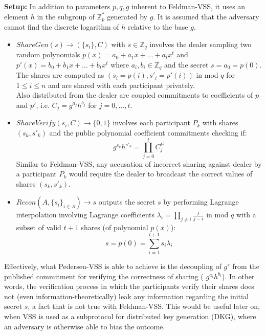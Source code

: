 \documentclass[letterpaper,twocolumn,10pt]{article}
\theoremstyle{definition}
\theoremstyle{remark}
\begin{document}
\textbf{Setup:} In addition to parameters $p,q,g$ inherent to Feldman-VSS, it uses an element $h$ in the subgroup of $\mathbb{Z}^*_p$ generated by $g$. It is assumed that the adversary cannot find the discrete logarithm of $h$ relative to the base $g$.

\begin{itemize}
\item $ShareGen(s) \rightarrow (\{s_i\}, C)$ with $s \in \mathbb{Z}_q$ involves the dealer sampling two random polynomials $p(x) = a_0 + a_1x+ \ldots+a_tx^t$ and $p'(x) = b_0 + b_1x +\ldots+b_tx^t$  where $a_i, b_i \in \mathbb{Z}_q$ and the secret $s = a_0 = p(0)$.\\
The shares are computed as $(s_i = p(i), s'_i = p'(i))$ in mod $q$ for $1 \le i \le n$ and are shared with each participant privately.\\
Also distributed from the dealer are coupled commitments to coefficients of $p$ and $p'$, i.e. $C_j = g^{a_j} h^{b_j}$ for $j = 0, ..., t$.
\item $ShareVerify(s_i, C) \rightarrow \{0, 1\}$ involves each participant $P_k$ with shares $(s_k, s'_k)$ and the public polynomial coefficient commitments checking if:
$$g^{s_k} h^{s'_k} = \prod_{j = 0}^{t} C_j^{k^j}$$
Similar to Feldman-VSS, any accusation of incorrect sharing against dealer by a participant $P_k$ would require the dealer to broadcast the correct values of shares $(s_k, s'_k)$.
\item $Recon(A, \{s_i\}_{i \in A}) \rightarrow s$ outputs the secret $s$ by performing Lagrange interpolation involving Lagrange coefficients $\lambda_i = \prod_{j \neq i} \frac{j}{j - i}$ in mod $q$ with a subset of valid $t+1$ shares (of polynomial $p(x)$):
    $$s = p(0) = \sum_{i = 1}^{t+1} s_i \lambda_i$$
\end{itemize}

Effectively, what Pedersen-VSS is able to achieve is the decoupling of $g^{s}$ from the published commitment for verifying the correctness of sharing ( $g^{a_i} h^{b_i}$). In other words, the verification process in which the participants verify their shares does not (even information-theoretically) leak any information regarding the initial secret $s$, a fact that is not true with Feldman-VSS. This would be useful later on, when VSS is used as a subprotocol for distributed key generation (DKG), where an adversary is otherwise able to bias the outcome.
\end{document}
